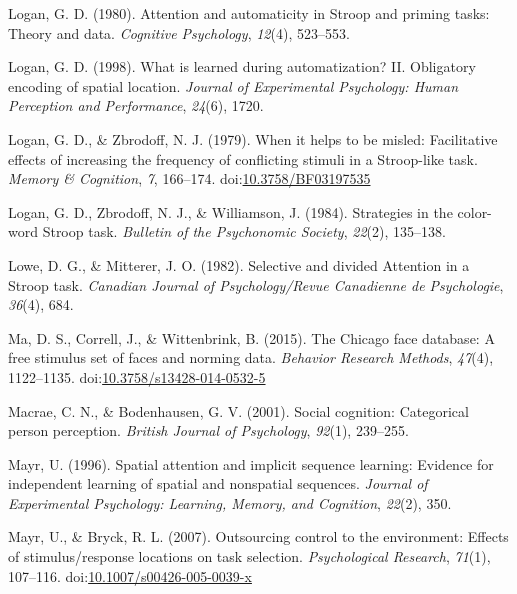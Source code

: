 \documentclass[english,,man,floatsintext]{apa6}
\begin{document}
\leavevmode\hypertarget{ref-logan_attention_1980}{}%
Logan, G. D. (1980). Attention and automaticity in Stroop and priming tasks: Theory and data. \emph{Cognitive Psychology}, \emph{12}(4), 523--553.

\leavevmode\hypertarget{ref-logan_what_1998}{}%
Logan, G. D. (1998). What is learned during automatization? II. Obligatory encoding of spatial location. \emph{Journal of Experimental Psychology: Human Perception and Performance}, \emph{24}(6), 1720.

\leavevmode\hypertarget{ref-logan_when_1979}{}%
Logan, G. D., \& Zbrodoff, N. J. (1979). When it helps to be misled: Facilitative effects of increasing the frequency of conflicting stimuli in a Stroop-like task. \emph{Memory \& Cognition}, \emph{7}, 166--174. doi:\href{https://doi.org/10.3758/BF03197535}{10.3758/BF03197535}

\leavevmode\hypertarget{ref-logan_strategies_1984}{}%
Logan, G. D., Zbrodoff, N. J., \& Williamson, J. (1984). Strategies in the color-word Stroop task. \emph{Bulletin of the Psychonomic Society}, \emph{22}(2), 135--138.

\leavevmode\hypertarget{ref-lowe_selective_1982}{}%
Lowe, D. G., \& Mitterer, J. O. (1982). Selective and divided Attention in a Stroop task. \emph{Canadian Journal of Psychology/Revue Canadienne de Psychologie}, \emph{36}(4), 684.

\leavevmode\hypertarget{ref-ma_chicago_2015}{}%
Ma, D. S., Correll, J., \& Wittenbrink, B. (2015). The Chicago face database: A free stimulus set of faces and norming data. \emph{Behavior Research Methods}, \emph{47}(4), 1122--1135. doi:\href{https://doi.org/10.3758/s13428-014-0532-5}{10.3758/s13428-014-0532-5}

\leavevmode\hypertarget{ref-macrae_social_2001}{}%
Macrae, C. N., \& Bodenhausen, G. V. (2001). Social cognition: Categorical person perception. \emph{British Journal of Psychology}, \emph{92}(1), 239--255.

\leavevmode\hypertarget{ref-mayr_spatial_1996}{}%
Mayr, U. (1996). Spatial attention and implicit sequence learning: Evidence for independent learning of spatial and nonspatial sequences. \emph{Journal of Experimental Psychology: Learning, Memory, and Cognition}, \emph{22}(2), 350.

\leavevmode\hypertarget{ref-mayr_outsourcing_2007}{}%
Mayr, U., \& Bryck, R. L. (2007). Outsourcing control to the environment: Effects of stimulus/response locations on task selection. \emph{Psychological Research}, \emph{71}(1), 107--116. doi:\href{https://doi.org/10.1007/s00426-005-0039-x}{10.1007/s00426-005-0039-x}
\end{document}
